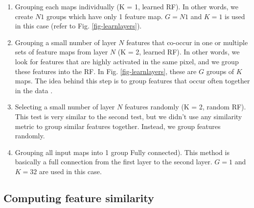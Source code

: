 \documentclass{article} %
\begin{document}
\begin{enumerate}

\item Grouping each maps individually (K = 1, learned RF). In other words, we create $N1$ groups which have only 1 feature map. 
$G = N1$ and $K = 1$ is used in this case (refer to Fig. \ref{fig-learnlayers}).

\item Grouping a small number of layer $N$ features that co-occur in one or multiple sets of feature maps from layer $N$ (K = 2, learned RF). 
In other words, we look for features that are highly activated in the same pixel, and we group these features into the RF.
In Fig. \ref{fig-learnlayers}, these are $G$ groups of $K$ maps.
The idea behind this step is to group features that occur often together in the data \cite{masquelier2007learning}.

\item Selecting a small number of layer $N$ features randomly (K = 2, random RF).
This test is very similar to the second test, but we didn't use any similarity metric to group similar features together.
Instead, we group features randomly.

\item Grouping all input maps into 1 group Fully connected).
This method is basically a full connection from the first layer to the second layer. 
$G = 1$ and $K = 32$ are used in this case.

\end{enumerate}

\subsection{Computing feature similarity}
\end{document}
